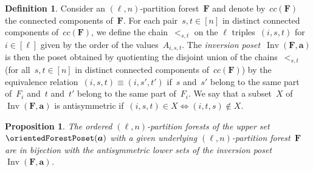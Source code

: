\documentclass{amsart}
\newcommand{\darkblue}{\color{darkblue}} %
\newtheorem{proposition}[theorem]{Proposition}
\theoremstyle{definition}
\newtheorem{definition}[theorem]{Definition}
\renewcommand{\b}[1]{{\boldsymbol{#1}}} %
\DeclareMathOperator{\Inv}{Inv} %
\newcommand{\defn}[1]{\textsl{\darkblue #1}} %
\renewcommand{\b}[1]{\boldsymbol{#1}} %
\begin{document}
\begin{definition}
Consider an $(\ell,n)$-partition forest~$\b{F}$ and denote by~$cc(\b{F})$ the connected components of~$\b{F}$.
For each pair~$s,t \in [n]$ in distinct connected components of~$cc(\b{F})$, we define the chain~$<_{s,t}$ on the $\ell$ triples~$(i,s,t)$ for~$i \in [\ell]$ given by the order of the values~$A_{i,s,t}$.
The \defn{inversion poset}~$\Inv(\b{F}, \b{a})$ is then the poset obtained by quotienting the disjoint union of the chains~$<_{s,t}$ (for all~$s,t \in [n]$ in distinct connected components of~$cc(\b{F})$) by the equivalence relation~$(i,s,t) \equiv (i,s',t')$ if~$s$ and~$s'$ belong to the same part of~$F_i$ and~$t$ and~$t'$ belong to the same part of~$F_i$.
We say that a subset~$X$ of~$\Inv(\b{F}, \b{a})$ is antisymmetric if~$(i,s,t) \in X \iff (i,t,s) \notin X$.
\end{definition}

\begin{proposition}
\label{prop:PFtoOPF2}
The ordered $(\ell,n)$-partition forests of the upper set~$\orientedForestPoset(\b{a})$ with a given underlying $(\ell,n)$-partition forest~$\b{F}$ are in bijection with the antisymmetric lower sets of the inversion poset~$\Inv(\b{F}, \b{a})$.
\end{proposition}
\end{document}
